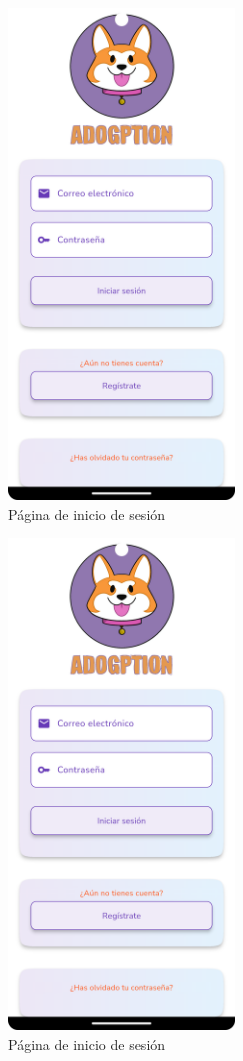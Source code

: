 \documentclass[a4paper, 12pt]{article}
\begin{document}
\begin{figure}[H]
	\begin{center}
		{\includegraphics[width=6cm]{app/Login.png}\par}
		\caption{Página de inicio de sesión}
	\end{center}
\end{figure}



\begin{figure}[H]
	\begin{center}
		{\includegraphics[width=6cm]{app/Login.png}\par}
		\caption{Página de inicio de sesión}
	\end{center}
\end{figure}
\end{document}
